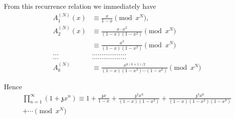 From this recurrence relation we immediately have
\begin{align*}
  A_1^{(N)} (x) & \equiv \frac{x}{1-x} \pmod{x^N},\\
  A_2^{(N)} (x) & \equiv \frac{x\cdot x^2}{(1-x)(1-x^2)} \pmod{x^N}\\
  & \equiv \frac{x^3}{(1-x)(1-x^2)} \pmod{x^N}\\
  \dots&\dots\dots\dots\dots\dots\dots\\
  \dots&\dots\dots\dots\dots\dots\dots\\
  A_k^{(N)} & \equiv \frac{x^{k(k+1)/2}}{(1-x)(1-x^2)\cdots (1-x^k)}
  \pmod{x^N} 
\end{align*}

Hence
\begin{multline*}
  \prod\limits_{n=1}^\infty (1+\mathfrak{z} x^n) \equiv 1+
  \frac{\mathfrak{z}x}{1-x} + \frac{\mathfrak{z}^2x^3}{(1-x)(1-x^2)} +
  \frac{\mathfrak{z}^3x^6}{(1-x)(1-x^2)(1-x^3)}\\
  + \cdots \pmod{x^N}
\end{multline*}

